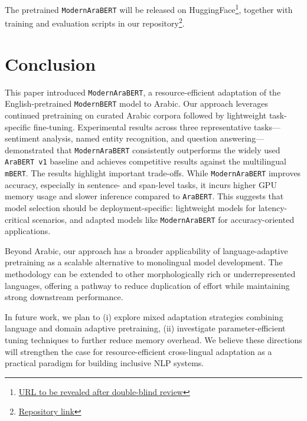 \documentclass[10pt, a4paper]{article}
\begin{document}
The pretrained \texttt{ModernAraBERT} will be released on HuggingFace\footnote{\href{http://}{URL to be revealed after double-blind review}}, together with training and evaluation scripts in our repository\footnote{\href{https://anonymous.4open.science/r/ModernAraBERT-823C/}{Repository link}}.





\section{Conclusion}

This paper introduced \texttt{ModernAraBERT}, a resource-efficient adaptation of the English-pretrained \texttt{ModernBERT} model to Arabic. Our approach leverages continued pretraining on curated Arabic corpora followed by lightweight task-specific fine-tuning. Experimental results across three representative tasks—sentiment analysis, named entity recognition, and question answering—demonstrated that \texttt{ModernAraBERT} consistently outperforms the widely used \texttt{AraBERT v1} baseline and achieves competitive results against the multilingual \texttt{mBERT}.  The results highlight important trade-offs. While \texttt{ModernAraBERT} improves accuracy, especially in sentence- and span-level tasks, it incurs higher GPU memory usage and slower inference compared to \texttt{AraBERT}. This suggests that model selection should be deployment-specific: lightweight models for latency-critical scenarios, and adapted models like \texttt{ModernAraBERT} for accuracy-oriented applications.  

Beyond Arabic, our approach has a broader applicability of language-adaptive pretraining as a scalable alternative to monolingual model development. The methodology can be extended to other morphologically rich or underrepresented languages, offering a pathway to reduce duplication of effort while maintaining strong downstream performance.  

In future work, we plan to (i) explore mixed adaptation strategies combining language and domain adaptive pretraining, (ii) investigate parameter-efficient tuning techniques to further reduce memory overhead. We believe these directions will strengthen the case for resource-efficient cross-lingual adaptation as a practical paradigm for building inclusive NLP systems.
\end{document}
